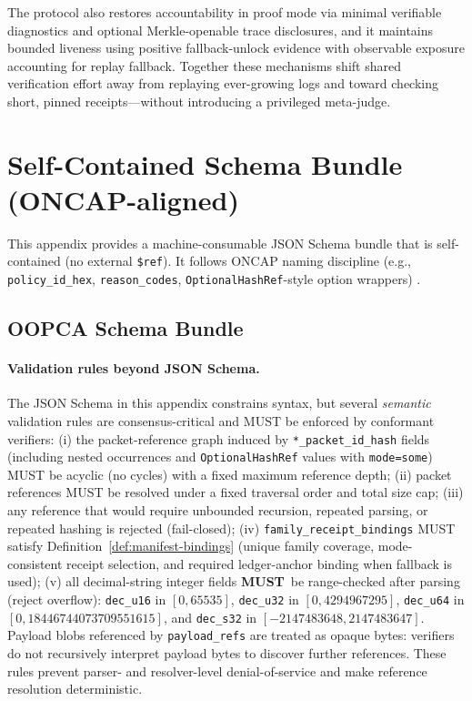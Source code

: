 \documentclass[11pt]{article}
\newcommand{\MUST}{\textbf{MUST}}
\begin{document}
The protocol also restores accountability in proof mode via minimal verifiable diagnostics and optional Merkle-openable trace disclosures, and it maintains bounded liveness using positive fallback-unlock evidence with observable exposure accounting for replay fallback. Together these mechanisms shift shared verification effort away from replaying ever-growing logs and toward checking short, pinned receipts---without introducing a privileged meta-judge.

\appendix


\section{Self-Contained Schema Bundle (ONCAP-aligned)}\label{app:schemas}

This appendix provides a machine-consumable JSON Schema bundle that is self-contained (no external \texttt{\$ref}). It follows ONCAP naming discipline (e.g., \texttt{policy\_id\_hex}, \texttt{reason\_codes}, \texttt{OptionalHashRef}-style option wrappers) \cite{Takahashi2026ONCAP}.

\subsection{OOPCA Schema Bundle}


\paragraph{Validation rules beyond JSON Schema.}
The JSON Schema in this appendix constrains syntax, but several \emph{semantic} validation rules are consensus-critical and MUST be enforced by conformant verifiers:
(i) the packet-reference graph induced by \texttt{*\_packet\_id\_hash} fields (including nested occurrences and \texttt{OptionalHashRef} values with \texttt{mode=some}) MUST be acyclic (no cycles) with a fixed maximum reference depth;
(ii) packet references MUST be resolved under a fixed traversal order and total size cap;
(iii) any reference that would require unbounded recursion, repeated parsing, or repeated hashing is rejected (fail-closed);
(iv) \texttt{family\_receipt\_bindings} MUST satisfy Definition~\ref{def:manifest-bindings} (unique family coverage, mode-consistent receipt selection, and required ledger-anchor binding when fallback is used);
(v) all decimal-string integer fields \MUST\ be range-checked after parsing (reject overflow): \texttt{dec\_u16} in $[0,65535]$, \texttt{dec\_u32} in $[0,4294967295]$, \texttt{dec\_u64} in $[0,18446744073709551615]$, and \texttt{dec\_s32} in $[-2147483648,2147483647]$.
Payload blobs referenced by \texttt{payload\_refs} are treated as opaque bytes: verifiers do not recursively interpret payload bytes to discover further references.
These rules prevent parser- and resolver-level denial-of-service and make reference resolution deterministic.
\end{document}
